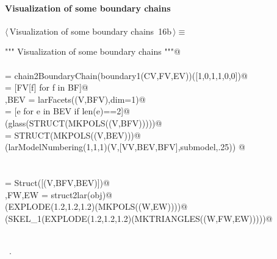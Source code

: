 \documentclass[11pt,oneside]{article}    %
\begin{document}
\paragraph{Visualization of some boundary chains}
\begin{flushleft} \small \label{scrap26}
\protect{}$\langle\,$Visualization of some boundary chains\nobreak\ {\footnotesize 16b}$\,\rangle\equiv$
\vspace{-1ex}
\begin{list}{}{} \item
\mbox{}\verb@""" Visualization of some boundary chains """@\\
\mbox{}\verb@@\\
\mbox{}\verb@BF = chain2BoundaryChain(boundary1(CV,FV,EV))([1,0,1,1,0,0])@\\
\mbox{}\verb@BFV = [FV[f] for f in BF]@\\
\mbox{}\verb@V,BEV = larFacets((V,BFV),dim=1)@\\
\mbox{}\verb@BEV = [e for e in BEV if len(e)==2]@\\
\mbox{}\verb@VIEW(glass(STRUCT(MKPOLS((V,BFV)))))@\\
\mbox{}\verb@submodel = STRUCT(MKPOLS((V,BEV)))@\\
\mbox{}\verb@VIEW(larModelNumbering(1,1,1)(V,[VV,BEV,BFV],submodel,.25)) @\\
\mbox{}\verb@@\\
\mbox{}\verb@@\\
\mbox{}\verb@obj = Struct([(V,BFV,BEV)])@\\
\mbox{}\verb@W,FW,EW = struct2lar(obj)@\\
\mbox{}\verb@VIEW(EXPLODE(1.2,1.2,1.2)(MKPOLS((W,EW))))@\\
\mbox{}\verb@VIEW(SKEL_1(EXPLODE(1.2,1.2,1.2)(MKTRIANGLES((W,FW,EW)))))@\\
\mbox{}\verb@@\\
\mbox{}\verb@@{\NWsep}
\end{list}
\vspace{-1ex}
\footnotesize\addtolength{\baselineskip}{-1ex}
\begin{list}{}{\setlength{\itemsep}{-\parsep}\setlength{\itemindent}{-\leftmargin}}
\item \NWtxtMacroRefIn\ .
\end{list}
\end{flushleft}
\end{document}
